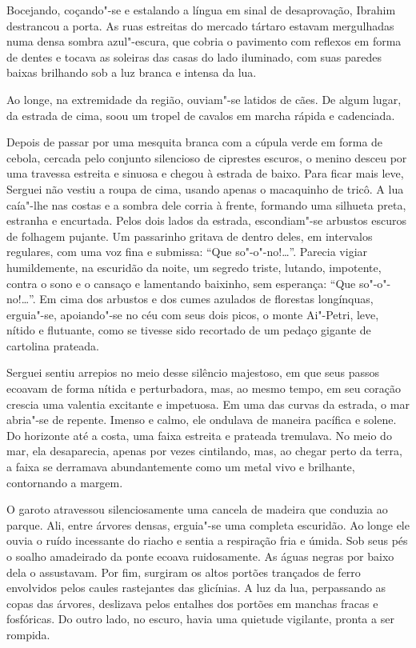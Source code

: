 Bocejando, coçando"-se e estalando a língua em sinal de desaprovação,
Ibrahim destrancou a porta. As ruas estreitas do mercado tártaro estavam
mergulhadas numa densa sombra azul"-escura, que cobria o pavimento com
reflexos em forma de dentes e tocava as soleiras das casas do lado
iluminado, com suas paredes baixas brilhando sob a luz branca e intensa
da lua.

Ao longe, na extremidade da região, ouviam"-se latidos de cães. De algum
lugar, da estrada de cima, soou um tropel de cavalos em marcha rápida e
cadenciada.

Depois de passar por uma mesquita branca com a cúpula verde em forma de
cebola, cercada pelo conjunto silencioso de ciprestes escuros, o menino
desceu por uma travessa estreita e sinuosa e chegou à estrada de baixo.
Para ficar mais leve, Serguei não vestiu a roupa de cima, usando apenas
o macaquinho de tricô. A lua caía"-lhe nas costas e a sombra dele corria
à frente, formando uma silhueta preta, estranha e encurtada. Pelos dois
lados da estrada, escondiam"-se arbustos escuros de folhagem pujante. Um
passarinho gritava de dentro deles, em intervalos regulares, com uma voz
fina e submissa: ``Que so"-o"-no!\ldots{}''. Parecia vigiar humildemente, na
escuridão da noite, um segredo triste, lutando, impotente, contra o sono
e o cansaço e lamentando baixinho, sem esperança: ``Que so"-o"-no!\ldots{}''. Em
cima dos arbustos e dos cumes azulados de florestas longínquas,
erguia"-se, apoiando"-se no céu com seus dois picos, o monte Ai"-Petri,
leve, nítido e flutuante, como se tivesse sido recortado de um pedaço
gigante de cartolina prateada.

Serguei sentiu arrepios no meio desse silêncio majestoso, em que seus
passos ecoavam de forma nítida e perturbadora, mas, ao mesmo tempo, em
seu coração crescia uma valentia excitante e impetuosa. Em uma das
curvas da estrada, o mar abria"-se de repente. Imenso e calmo, ele
ondulava de maneira pacífica e solene. Do horizonte até a costa, uma
faixa estreita e prateada tremulava. No meio do mar, ela desaparecia,
apenas por vezes cintilando, mas, ao chegar perto da terra, a faixa se
derramava abundantemente como um metal vivo e brilhante, contornando a
margem.

O garoto atravessou silenciosamente uma cancela de madeira que conduzia
ao parque. Ali, entre árvores densas, erguia"-se uma completa escuridão.
Ao longe ele ouvia o ruído incessante do riacho e sentia a respiração
fria e úmida. Sob seus pés o soalho amadeirado da ponte ecoava
ruidosamente. As águas negras por baixo dela o assustavam. Por fim,
surgiram os altos portões trançados de ferro envolvidos pelos caules
rastejantes das glicínias. A luz da lua, perpassando as copas das
árvores, deslizava pelos entalhes dos portões em manchas fracas e
fosfóricas. Do outro lado, no escuro, havia uma quietude vigilante,
pronta a ser rompida.

